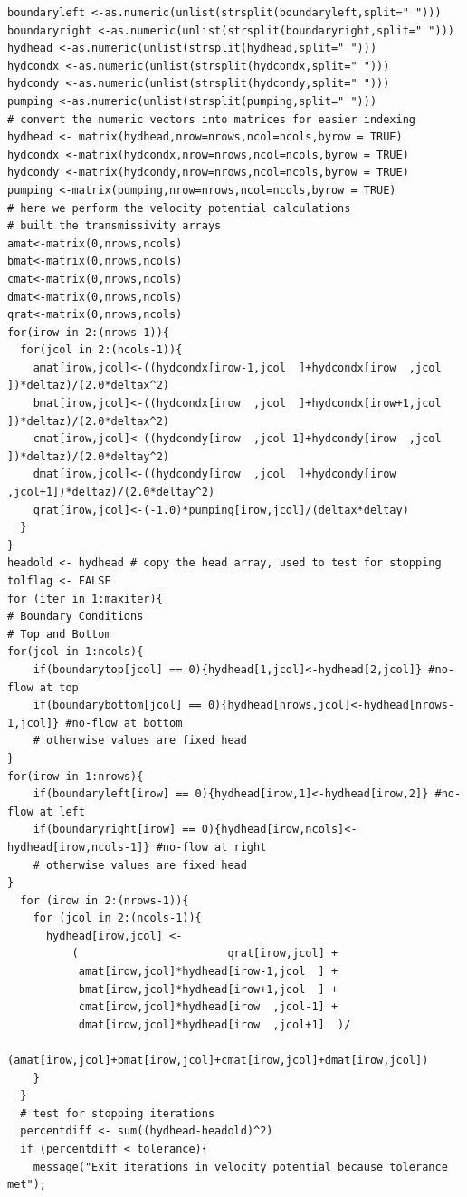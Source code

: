 \begin{lstlisting}[caption= Input file for 2D Steady flow with generalized boundary conditions and wells , label=lst:AddWellsFrags]
boundaryleft <-as.numeric(unlist(strsplit(boundaryleft,split=" ")))
boundaryright <-as.numeric(unlist(strsplit(boundaryright,split=" ")))
hydhead <-as.numeric(unlist(strsplit(hydhead,split=" ")))
hydcondx <-as.numeric(unlist(strsplit(hydcondx,split=" ")))
hydcondy <-as.numeric(unlist(strsplit(hydcondy,split=" ")))
pumping <-as.numeric(unlist(strsplit(pumping,split=" ")))
# convert the numeric vectors into matrices for easier indexing
hydhead <- matrix(hydhead,nrow=nrows,ncol=ncols,byrow = TRUE)
hydcondx <-matrix(hydcondx,nrow=nrows,ncol=ncols,byrow = TRUE)
hydcondy <-matrix(hydcondy,nrow=nrows,ncol=ncols,byrow = TRUE)
pumping <-matrix(pumping,nrow=nrows,ncol=ncols,byrow = TRUE)
# here we perform the velocity potential calculations
# built the transmissivity arrays
amat<-matrix(0,nrows,ncols) 
bmat<-matrix(0,nrows,ncols) 
cmat<-matrix(0,nrows,ncols)
dmat<-matrix(0,nrows,ncols)
qrat<-matrix(0,nrows,ncols)
for(irow in 2:(nrows-1)){
  for(jcol in 2:(ncols-1)){
    amat[irow,jcol]<-((hydcondx[irow-1,jcol  ]+hydcondx[irow  ,jcol  ])*deltaz)/(2.0*deltax^2)
    bmat[irow,jcol]<-((hydcondx[irow  ,jcol  ]+hydcondx[irow+1,jcol  ])*deltaz)/(2.0*deltax^2)
    cmat[irow,jcol]<-((hydcondy[irow  ,jcol-1]+hydcondy[irow  ,jcol  ])*deltaz)/(2.0*deltay^2)
    dmat[irow,jcol]<-((hydcondy[irow  ,jcol  ]+hydcondy[irow  ,jcol+1])*deltaz)/(2.0*deltay^2)
    qrat[irow,jcol]<-(-1.0)*pumping[irow,jcol]/(deltax*deltay)
  }
}
headold <- hydhead # copy the head array, used to test for stopping 
tolflag <- FALSE
for (iter in 1:maxiter){
# Boundary Conditions
# Top and Bottom
for(jcol in 1:ncols){
    if(boundarytop[jcol] == 0){hydhead[1,jcol]<-hydhead[2,jcol]} #no-flow at top
    if(boundarybottom[jcol] == 0){hydhead[nrows,jcol]<-hydhead[nrows-1,jcol]} #no-flow at bottom
    # otherwise values are fixed head
}
for(irow in 1:nrows){
    if(boundaryleft[irow] == 0){hydhead[irow,1]<-hydhead[irow,2]} #no-flow at left
    if(boundaryright[irow] == 0){hydhead[irow,ncols]<-hydhead[irow,ncols-1]} #no-flow at right
    # otherwise values are fixed head
}
  for (irow in 2:(nrows-1)){
    for (jcol in 2:(ncols-1)){
      hydhead[irow,jcol] <- 
          (                       qrat[irow,jcol] +
           amat[irow,jcol]*hydhead[irow-1,jcol  ] +
           bmat[irow,jcol]*hydhead[irow+1,jcol  ] +
           cmat[irow,jcol]*hydhead[irow  ,jcol-1] +
           dmat[irow,jcol]*hydhead[irow  ,jcol+1]  )/
        (amat[irow,jcol]+bmat[irow,jcol]+cmat[irow,jcol]+dmat[irow,jcol])
    }
  }
  # test for stopping iterations
  percentdiff <- sum((hydhead-headold)^2)
  if (percentdiff < tolerance){
    message("Exit iterations in velocity potential because tolerance met");

\end{lstlisting}
